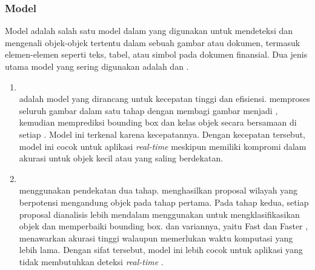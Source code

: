 \subsubsection{Model \objectdetection}
Model \objectdetection{} adalah salah satu model dalam \dl{} yang digunakan untuk mendeteksi dan mengenali objek-objek tertentu dalam sebuah gambar atau dokumen, termasuk elemen-elemen seperti teks, tabel, atau simbol pada dokumen finansial. Dua jenis utama model \objectdetection{} yang sering digunakan adalah \yolofull{} dan \rcnnfull{}.
	\begin{enumerate}
		\item \yolo~\\
		\yolo{} adalah model \objectdetection{} yang dirancang untuk kecepatan tinggi dan efisiensi. \yolo{} memproses seluruh gambar dalam satu tahap dengan membagi gambar menjadi \grid{}, kemudian memprediksi bounding box dan kelas objek secara bersamaan di setiap \grid{} \parencite{diwan2023object}. Model ini terkenal karena kecepatannya. Dengan kecepatan tersebut, model ini cocok untuk aplikasi \emph{real-time} meskipun memiliki kompromi dalam akurasi untuk objek kecil atau yang saling berdekatan.
		\item \rcnn~\\
		\rcnn{} menggunakan pendekatan dua tahap. \rcnn{} menghasilkan proposal wilayah yang berpotensi mengandung objek pada tahap pertama. Pada tahap kedua, setiap proposal dianalisis lebih mendalam menggunakan \cnn{} untuk mengklasifikasikan objek dan memperbaiki bounding box. \rcnn{} dan variannya, yaitu Fast \rcnn{} dan Faster \rcnn{}, menawarkan akurasi tinggi walaupun memerlukan waktu komputasi yang lebih lama. Dengan sifat tersebut, model ini lebih cocok untuk aplikasi yang tidak membutuhkan deteksi \emph{real-time} \parencite{xie2021oriented}.
	\end{enumerate}